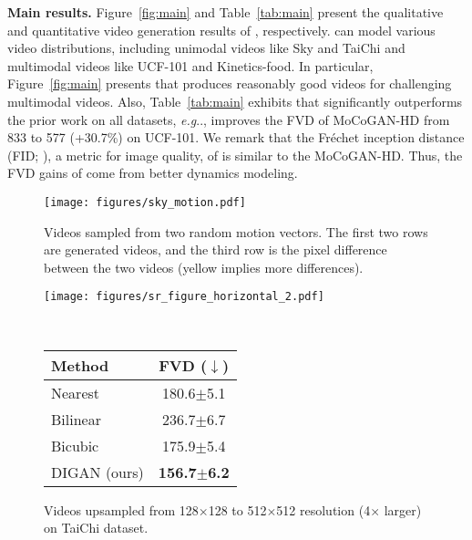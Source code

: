 \documentclass{article} \usepackage{iclr2022_conference,times}
\makeatletter
\DeclareRobustCommand\onedot{\futurelet\@let@token\@onedot}
\def\@onedot{\ifx\@let@token.\else.\null\fi\xspace}
\def\eg{\emph{e.g}\onedot} \def\Eg{\emph{E.g}\onedot}
\newcommand{\stdv}[1]{\scriptsize$\pm$#1}
\makeatother
\begin{document}
\textbf{Main results.}
Figure~\ref{fig:main} and Table~\ref{tab:main} present the qualitative and quantitative video generation results of \sname, respectively. \sname can model various video distributions, including unimodal videos like Sky and TaiChi and multimodal videos like UCF-101 and Kinetics-food. In particular, Figure~\ref{fig:main} presents that \sname produces reasonably good videos for challenging multimodal videos. Also, Table~\ref{tab:main} exhibits that \sname significantly outperforms the prior work on all datasets, \eg, improves the FVD of MoCoGAN-HD from 833 to 577 (+30.7\%) on UCF-101. We remark that the Fr\'echet inception distance (FID; \citet{heusel2017gans}), a metric for image quality, of \sname is similar to the MoCoGAN-HD. Thus, the FVD gains of \sname come from better dynamics modeling.


\begin{figure*}[t]
\centering
\vspace{-0.1in}
\texttt{[image: figures/sky\_motion.pdf]}
\vspace{-0.05in}
\caption{
Videos sampled from two random motion vectors. The first two rows are generated videos, and the third row is the pixel difference between the two videos (yellow implies more differences).
}\label{fig:motion}
\vspace{-0.05in}
\end{figure*} \begin{figure*}[t]
\centering\small
\vspace{-0.05in}
\begin{minipage}{0.58\textwidth}
\centering\small
\texttt{[image: figures/sr\_figure\_horizontal\_2.pdf]}
\vspace{-0.27in}
\caption{
Videos upsampled from 128$\times$128 to 512$\times$512 resolution (4$\times$ larger) on TaiChi dataset.
}\label{fig:sr}
\end{minipage}
~
\begin{minipage}{0.38\textwidth}
\centering\small
{}\label{tab:sr}
\vspace{-0.1in}
\begin{tabular}{lc}
\toprule
Method &   FVD ($\downarrow$) \\
 \midrule
  Nearest      & 180.6\stdv{5.1} \\
  Bilinear     & 236.7\stdv{6.7} \\
  Bicubic      & 175.9\stdv{5.4} \\
 \midrule
  DIGAN (ours) & \textbf{156.7\stdv{6.2}} \\
\bottomrule
\end{tabular}
\end{minipage}
\vspace{-0.1in}
\end{figure*} 
\end{document}
